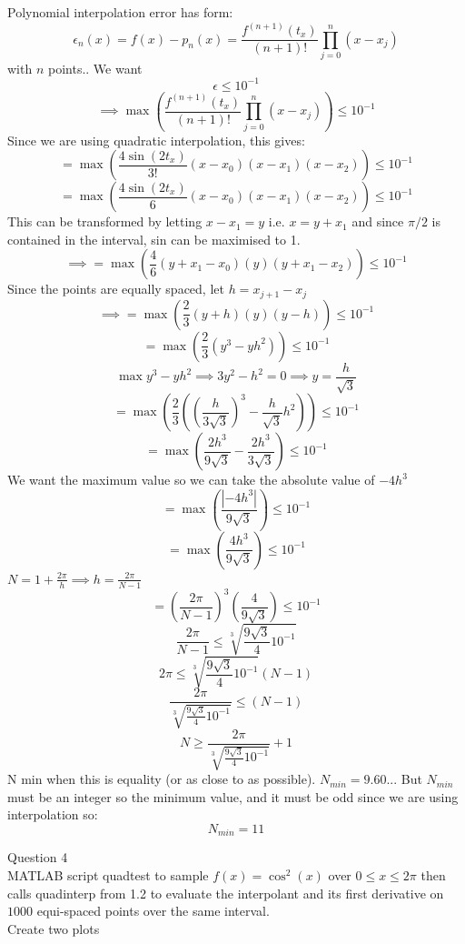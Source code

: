 \documentclass[a4paper]{article}
\begin{document}
	Polynomial interpolation error has form:
	$$\epsilon_n(x) = f(x)-p_n(x) = \frac{f^{(n+1)}(t_x)}{(n+1)!}\prod_{j=0}^{n}(x-x_j)$$
	with $n$ points..
	We want 
	$$\epsilon \leq 10^{-1}$$
	$$\implies \max\left(\frac{f^{(n+1)}(t_x)}{(n+1)!}\prod_{j=0}^{n}(x-x_j)\right)\leq 10^{-1}$$
	Since we are using quadratic interpolation, this gives:
	$$=\max\left(\frac{4\sin(2t_x)}{3!}(x-x_0)(x-x_1)(x-x_2)\right)\leq 10^{-1}$$
	$$=\max\left(\frac{4\sin(2t_x)}{6}(x-x_0)(x-x_1)(x-x_2)\right)\leq 10^{-1}$$
	This can be transformed by letting $x-x_1 = y$ i.e. $x=y+x_1 $ and since $\pi/2 $ is contained in the interval, sin can be maximised to 1.
	$$\implies =\max\left(\frac{4}{6}(y+x_1-x_0)(y)(y+x_1-x_2)\right)\leq 10^{-1}$$
	Since the points are equally spaced, let $h=x_{j+1}-x_j$
	$$\implies =\max\left(\frac{2}{3}(y+h)(y)(y-h)\right)\leq 10^{-1}$$
	$$ =\max\left(\frac{2}{3}(y^3 - yh^2)\right)\leq 10^{-1}$$
	$$ \max {y^3 - yh^2} \implies 3y^2 -h^2 = 0 \implies y= \frac{h}{\sqrt{3}}$$
	$$ =\max\left(\frac{2}{3}((\frac{h}{3\sqrt{3}})^3 - \frac{h}{\sqrt{3}} h^2)\right)\leq 10^{-1}$$
	$$ =\max\left(\frac{2h^3}{9\sqrt{3}} - \frac{2h^3}{3\sqrt{3}} \right)\leq 10^{-1}$$
	We want the maximum value so we can take the absolute value of $-4h^3$
	$$ =\max\left(\frac{|-4h^3|}{9\sqrt{3}}\right)\leq 10^{-1}$$
$$ =\max\left(\frac{4h^3}{9\sqrt{3}}\right)\leq 10^{-1}$$
$N=1 + \frac{2\pi}{h} \implies h = \frac{2\pi}{N-1}$
$$ =\left(\frac{2\pi}{N-1}\right)^3 \left(\frac{4}{9\sqrt{3}}\right)\leq 10^{-1}$$
$$ \frac{2\pi}{N-1} \leq \sqrt[3]{\frac{9\sqrt{3}}{4}10^{-1}} $$
$$ 2\pi \leq \sqrt[3]{\frac{9\sqrt{3}}{4}10^{-1}} (N-1) $$
$$ \frac{2\pi}{\sqrt[3]{\frac{9\sqrt{3}}{4}10^{-1}}} \leq  (N-1) $$
$$N\geq \frac{2\pi}{\sqrt[3]{\frac{9\sqrt{3}}{4}10^{-1}}} +1 $$
	N min when this is equality (or as close to as possible).
	$N_{min} =  9.60 ...$ But $N_{min}$ must be an integer so the minimum value, and it must be odd since we are using interpolation so:
	$$N_{min} = 11$$
	
	
	
	
	
	
	\newpage
	Question 4\\
	MATLAB script quadtest to sample $f(x)=\cos^2(x)$ over $0\leq x\leq 2\pi$ then calls quadinterp from 1.2 to evaluate the interpolant and its first derivative on $1000$ equi-spaced points over the same interval.\\
	Create two plots\\
	
\end{document}
